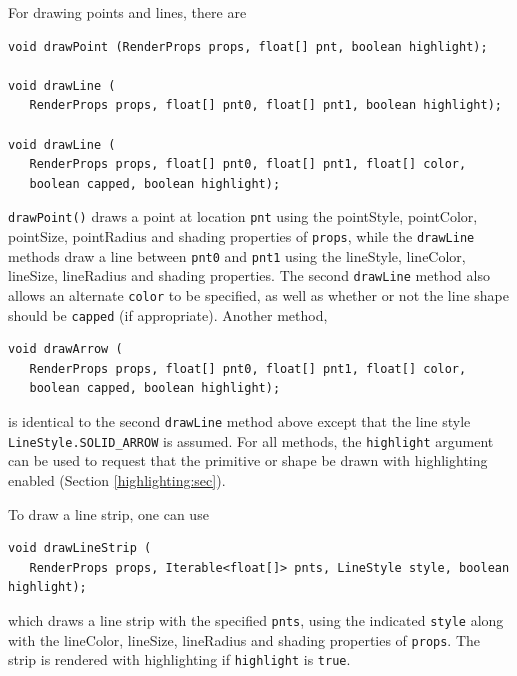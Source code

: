 For drawing points and lines, there are
%
\begin{lstlisting}[]
void drawPoint (RenderProps props, float[] pnt, boolean highlight);

void drawLine (
   RenderProps props, float[] pnt0, float[] pnt1, boolean highlight);

void drawLine (
   RenderProps props, float[] pnt0, float[] pnt1, float[] color, 
   boolean capped, boolean highlight);
\end{lstlisting}
%
{\tt drawPoint()} draws a point at location {\tt pnt} using the {\sf
pointStyle}, {\sf pointColor}, {\sf pointSize}, {\sf pointRadius} and
{\sf shading} properties of {\tt props}, while the {\tt drawLine}
methods draw a line between {\tt pnt0} and {\tt pnt1} using the {\sf
lineStyle}, {\sf lineColor}, {\sf lineSize}, {\sf lineRadius} and {\sf
shading} properties. The second {\tt drawLine} method also allows an
alternate {\tt color} to be specified, as well as whether or not the
line shape should be {\tt capped} (if appropriate).  Another method,
%
\begin{lstlisting}[]
void drawArrow (
   RenderProps props, float[] pnt0, float[] pnt1, float[] color, 
   boolean capped, boolean highlight);
\end{lstlisting}
%
is identical to the second {\tt drawLine} method above except that the line
style {\tt LineStyle.SOLID\_ARROW} is assumed. For all methods, the
{\tt highlight} argument can be used to request that the primitive
or shape be
drawn with highlighting enabled (Section
\ref{highlighting:sec}).

To draw a line strip, one can use
%
\begin{lstlisting}[]
void drawLineStrip (
   RenderProps props, Iterable<float[]> pnts, LineStyle style, boolean highlight);
\end{lstlisting}
%
which draws a line strip with the specified {\tt pnts}, using the
indicated {\tt style} along with the {\sf lineColor}, {\sf lineSize},
{\sf lineRadius} and {\sf shading} properties of {\tt props}. The
strip is rendered with highlighting if {\tt highlight} is {\tt true}.

